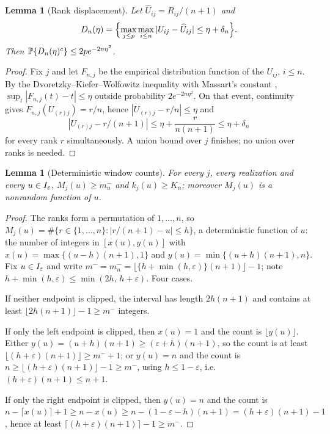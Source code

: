 \documentclass[bj,authoryear]{imsart}
\theoremstyle{plain}
\newtheorem{lemma}[theorem]{Lemma}
\begin{document}
\begin{appendix}
\begin{lemma}[Rank displacement]\label{lem:app-dkw}
Let $\widehat U_{ij}=R_{ij}/(n+1)$ and
\[
 D_n(\eta)=\Bigl\{\max_{j\le p}\max_{i\le n}
 |U_{ij}-\widehat U_{ij}|\le\eta+\delta_n\Bigr\}.
\]
Then $\mathbb P\{D_n(\eta)^c\}\le2pe^{-2n\eta^2}$.
\end{lemma}

\begin{proof}
Fix $j$ and let $F_{n,j}$ be the empirical distribution function of the
$U_{ij}$, $i\le n$.  By the Dvoretzky--Kiefer--Wolfowitz inequality with
Massart's constant \citep{massart1990},
$\sup_t|F_{n,j}(t)-t|\le\eta$ outside probability
$2e^{-2n\eta^2}$.  On that event, continuity gives
$F_{n,j}(U_{(r)j})=r/n$, hence $|U_{(r)j}-r/n|\le\eta$ and
\[
 |U_{(r)j}-r/(n+1)|\le\eta+\frac{r}{n(n+1)}\le\eta+\delta_n
\]
for every rank $r$ simultaneously.  A union bound over $j$ finishes; no
union over ranks is needed.
\end{proof}

\begin{lemma}[Deterministic window counts]\label{lem:app-counts}
For every $j$, every realization and every $u\in I_\varepsilon$,
$M_j(u)\ge m_n^-$ and $k_j(u)\ge K_n$; moreover $M_j(u)$ is a nonrandom
function of $u$.
\end{lemma}

\begin{proof}
The ranks form a permutation of $1,\ldots,n$, so
$M_j(u)=\#\{r\in\{1,\ldots,n\}:|r/(n+1)-u|\le h\}$, a deterministic
function of $u$: the number of integers in
$[x(u),y(u)]$ with $x(u)=\max\{(u-h)(n+1),1\}$ and
$y(u)=\min\{(u+h)(n+1),n\}$.  Fix $u\in I_\varepsilon$ and write
$m^-=m_n^-=\lfloor\{h+\min(h,\varepsilon)\}(n+1)\rfloor-1$; note
$h+\min(h,\varepsilon)\le\min(2h,\,h+\varepsilon)$.  Four cases.

If neither endpoint is clipped, the interval has length $2h(n+1)$ and
contains at least $\lfloor2h(n+1)\rfloor-1\ge m^-$ integers.

If only the left endpoint is clipped, then $x(u)=1$ and the count is
$\lfloor y(u)\rfloor$.  Either $y(u)=(u+h)(n+1)\ge(\varepsilon+h)(n+1)$,
so the count is at least
$\lfloor(h+\varepsilon)(n+1)\rfloor\ge m^-+1$; or $y(u)=n$ and the count
is $n\ge\lfloor(h+\varepsilon)(n+1)\rfloor-1\ge m^-$, using
$h\le1-\varepsilon$, i.e.\ $(h+\varepsilon)(n+1)\le n+1$.

If only the right endpoint is clipped, then $y(u)=n$ and the count is
$n-\lceil x(u)\rceil+1\ge n-x(u)\ge n-(1-\varepsilon-h)(n+1)
=(h+\varepsilon)(n+1)-1$, hence at least
$\lceil(h+\varepsilon)(n+1)\rceil-1\ge m^-$.


\end{proof}
\end{appendix}
\end{document}
